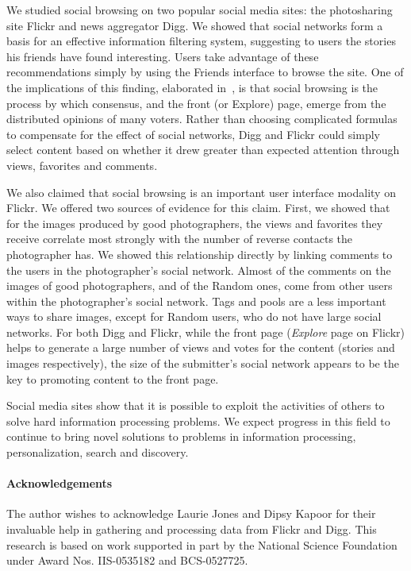 \documentclass[]{article}
\newcommand{\source}[1]{\textsf{#1}}
\begin{document}
We studied social browsing on two popular social media sites: the photosharing site Flickr
and news aggregator Digg. We showed that social networks
form a basis for an effective information filtering system, suggesting to users the stories his friends
have found interesting. Users take advantage of these
recommendations simply by using the Friends interface to browse the
site. One of the implications of this finding,
elaborated in~\cite{Lerman07ic}, is that social browsing is the process by which
consensus, and the front (or Explore) page, emerge from the distributed opinions of many voters.
Rather than choosing complicated formulas to compensate for the
effect of social networks, Digg and Flickr could simply select
content based on whether it drew greater than expected
attention through views, favorites and comments.


We also claimed that social browsing is an important user interface
modality on Flickr. We offered two sources of evidence for this claim.
First, we showed that for the images produced by good photographers,
the views and favorites they receive correlate most strongly with
the number of reverse contacts the photographer has. We showed this
relationship directly by linking comments to the users in the
photographer's social network. Almost  of the comments on the
images of good photographers, and  of the \source{Random} ones,
come from other users within the photographer's social network.
Tags and pools are a less important ways to share images, except for \source{Random}
users, who do not have large social networks.
For both Digg and Flickr, while the front page (\emph{Explore} page on
Flickr) helps to
generate a large number of views and votes for the content (stories and images respectively), the
size of the submitter's social network appears to be the key to
promoting content to the front page.


Social media sites show that it is possible to exploit the activities of others
to solve hard information processing problems. We expect progress in this field to
continue to bring novel solutions to problems in information processing, personalization,
search and discovery.


\paragraph{Acknowledgements} The author wishes to acknowledge Laurie
Jones and Dipsy Kapoor for their invaluable help in gathering and
processing data from Flickr and Digg.
This research is based on work supported in part by the National Science
Foundation under Award Nos. IIS-0535182 and BCS-0527725.

\newpage



\end{document}
